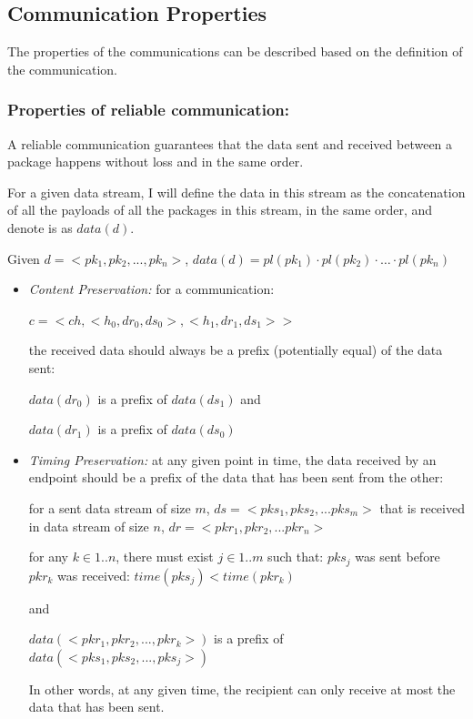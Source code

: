 \subsection{Communication Properties}
The properties of the communications can be described based on the definition of the communication.

\subsubsection{Properties of reliable communication:}
A reliable communication guarantees that the data sent and received between a package happens without loss and in the same order.

For a given data stream, I will define the data in this stream as the concatenation of all the payloads of all the packages in this stream, in the same order, and denote is as $data(d)$.

Given $ d = <pk_1, pk_2, ..., pk_n>$, $data(d) = pl(pk_1) \cdot pl(pk_2)\cdot \ldots \cdot pl(pk_n)$


\begin{itemize}
 \item \textit{ Content Preservation:} for a communication:

$c = <ch, <h_0, dr_0, ds_0>, <h_1, dr_1, ds_1>>$

the received data should always be a prefix (potentially equal) of the data sent:

$data(dr_0)$ is a prefix of $data(ds_1)$  and

$data(dr_1)$ is a prefix of $data(ds_0)$

 \item \textit{Timing Preservation:} at any given point in time, the data received by an endpoint should be a prefix of the data that has been sent from the other:
 
for a sent data stream of size $m$, $ds= <pks_1, pks_2, ... pks_m>$ that is received in data stream of size $n$, $dr = <pkr_1, pkr_2, ... pkr_n>$

for any $k \in {1..n}$, there must exist $j \in {1..m}$ such that: $pks_j$ was sent before $pkr_k$ was received:
$  time(pks_j) < time(pkr_k)$

  and

$  data(<pkr_1, pkr_2, ..., pkr_k>)$ is a prefix of $data(<pks_1, pks_2, ..., pks_j>)$

  In other words, at any given time, the recipient can only receive at most the data that has been sent.

\end{itemize}

